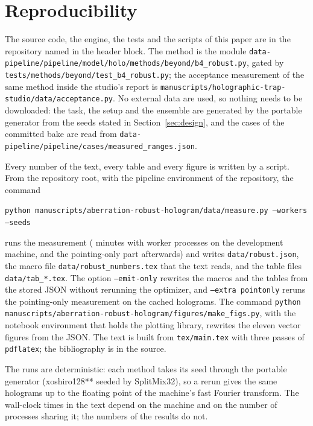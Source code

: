 \section{Reproducibility}\label{sec:repro}

The source code, the engine, the tests and the scripts of this paper are in the repository named in the header block. The method is the module \texttt{data-pipeline/pipeline/model/holo/methods/beyond/b4\_robust.py}, gated by \texttt{tests/methods/beyond/test\_b4\_robust.py}; the acceptance measurement of the same method inside the studio's report is
\texttt{manuscripts/holographic-trap-studio/data/acceptance.py}. No external data are used, so nothing needs to be downloaded: the task, the setup and the ensemble are generated by the portable generator from the seeds stated in Section~\ref{sec:design}, and the cases of the committed bake are read from
\texttt{data-pipeline/pipeline/cases/measured\_ranges.json}.

Every number of the text, every table and every figure is written by a script. From the repository root, with the pipeline environment of the repository, the command
\begin{center}\texttt{python manuscripts/aberration-robust-hologram/data/measure.py --workers \workersUsed{} --seeds \nSeedsAll}\end{center}
runs the measurement (\totalMinutes{} minutes with \workersUsed{} worker processes on the development machine, and the pointing-only part afterwards) and writes \texttt{data/robust.json}, the macro file \texttt{data/robust\_numbers.tex} that the text reads, and the table files \texttt{data/tab\_*.tex}. The option \texttt{--emit-only} rewrites the macros and the tables from the stored JSON without rerunning the optimizer, and \texttt{--extra pointonly}
reruns the pointing-only measurement on the cached holograms. The command \texttt{python manuscripts/aberration-robust-hologram/figures/make\_figs.py}, with the notebook environment that holds the plotting library, rewrites the eleven vector figures from the JSON. The text is built from \texttt{tex/main.tex} with three passes of \texttt{pdflatex}; the bibliography is in the source.

The runs are deterministic: each method takes its seed through the portable generator (xoshiro128** seeded by SplitMix32), so a rerun gives the same holograms up to the floating point of the machine's fast Fourier transform. The wall-clock times in the text depend on the machine and on the number of processes sharing it; the numbers of the results do not.
